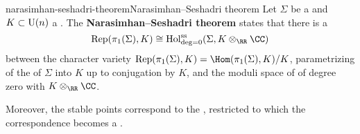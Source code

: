 \begin{topic}{narasimhan-seshadri-theorem}{Narasimhan--Seshadri theorem}
    Let $\Sigma$ be a  and $K \subset \textup{U}(n)$ a . The \textbf{Narasimhan--Seshadri theorem} states that there is a 
    \[ \operatorname{Rep}(\pi_1(\Sigma), K) \cong \operatorname{Hol}^\textup{ss}_{\textup{deg} = 0}(\Sigma, K \otimes_\RR \CC) \]
    between the character variety $\operatorname{Rep}(\pi_1(\Sigma), K) = \Hom(\pi_1(\Sigma), K) / K$, parametrizing  of the  of $\Sigma$ into $K$ up to conjugation by $K$, and the moduli space of    of degree zero with  $K \otimes_\RR \CC$.
    
    Moreover, the stable points correspond to the , restricted to which the correspondence becomes a .
\end{topic}
